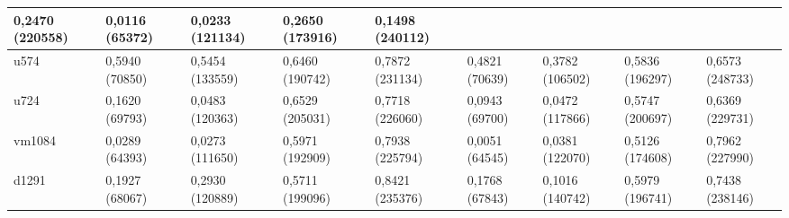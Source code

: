 \begin{longtable}[c]{|l|llll|llll|}
      0,2470 (220558) &
      \multicolumn{1}{l|}{0,0116 (65372)} &
      \multicolumn{1}{l|}{0,0233 (121134)} &
      \multicolumn{1}{l|}{0,2650 (173916)} &
      0,1498 (240112) \\ \hline
    u574 &
      \multicolumn{1}{l|}{0,5940 (70850)} &
      \multicolumn{1}{l|}{0,5454 (133559)} &
      \multicolumn{1}{l|}{0,6460 (190742)} &
      0,7872 (231134) &
      \multicolumn{1}{l|}{0,4821 (70639)} &
      \multicolumn{1}{l|}{0,3782 (106502)} &
      \multicolumn{1}{l|}{0,5836 (196297)} &
      0,6573 (248733) \\ \hline
    u724 &
      \multicolumn{1}{l|}{0,1620 (69793)} &
      \multicolumn{1}{l|}{0,0483 (120363)} &
      \multicolumn{1}{l|}{0,6529 (205031)} &
      0,7718 (226060) &
      \multicolumn{1}{l|}{0,0943 (69700)} &
      \multicolumn{1}{l|}{0,0472 (117866)} &
      \multicolumn{1}{l|}{0,5747 (200697)} &
      0,6369 (229731) \\ \hline
    vm1084 &
      \multicolumn{1}{l|}{0,0289 (64393)} &
      \multicolumn{1}{l|}{0,0273 (111650)} &
      \multicolumn{1}{l|}{0,5971 (192909)} &
      0,7938 (225794) &
      \multicolumn{1}{l|}{0,0051 (64545)} &
      \multicolumn{1}{l|}{0,0381 (122070)} &
      \multicolumn{1}{l|}{0,5126 (174608)} &
      0,7962 (227990) \\ \hline
    d1291 &
      \multicolumn{1}{l|}{0,1927 (68067)} &
      \multicolumn{1}{l|}{0,2930 (120889)} &
      \multicolumn{1}{l|}{0,5711 (199096)} &
      0,8421 (235376) &
      \multicolumn{1}{l|}{0,1768 (67843)} &
      \multicolumn{1}{l|}{0,1016 (140742)} &
      \multicolumn{1}{l|}{0,5979 (196741)} &
      0,7438 (238146) \\ \hline
    \end{longtable}

